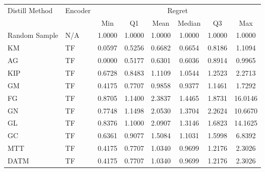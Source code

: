 \begin{tabular}{llcccccc}
\toprule
Distill Method & Encoder & \multicolumn{6}{c}{Regret} \\
 &  & Min & Q1 & Mean & Median & Q3 & Max \\
\midrule
Random Sample & N/A & 1.0000 & 1.0000 & 1.0000 & 1.0000 & 1.0000 & 1.0000 \\
\midrule
KM &  TF & 0.0597 & 0.5256 & 0.6682 & 0.6654 & 0.8186 & 1.1094 \\
\midrule
AG &  TF & 0.0000 & 0.5177 & 0.6301 & 0.6036 & 0.8914 & 0.9965 \\
\midrule
KIP &  TF & 0.6728 & 0.8483 & 1.1109 & 1.0544 & 1.2523 & 2.2713 \\
\midrule
GM &  TF & 0.4175 & 0.7707 & 0.9858 & 0.9377 & 1.1461 & 1.7292 \\
\midrule
FG &  TF & 0.8705 & 1.1400 & 2.3837 & 1.4465 & 1.8731 & 16.0146 \\
\midrule
GN &  TF & 0.7748 & 1.1498 & 2.0530 & 1.3704 & 2.2624 & 10.6670 \\
\midrule
GL &  TF & 0.8376 & 1.1000 & 2.0907 & 1.3146 & 1.6823 & 14.1625 \\
\midrule
GC &  TF & 0.6361 & 0.9077 & 1.5084 & 1.1031 & 1.5998 & 6.8392 \\
\midrule
MTT &  TF & 0.4175 & 0.7707 & 1.0340 & 0.9699 & 1.2176 & 2.3026 \\
DATM &  TF & 0.4175 & 0.7707 & 1.0340 & 0.9699 & 1.2176 & 2.3026 \\
\bottomrule
\end{tabular}
